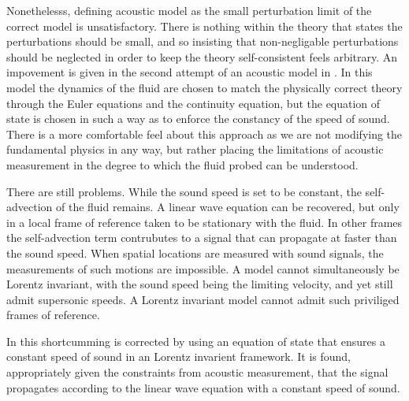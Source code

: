 Nonethelesss, defining acoustic model as the small perturbation limit of the correct model is unsatisfactory.
There is nothing within the theory that states the perturbations should be small,
and so insisting that non-negligable perturbations should be neglected in order to keep the
theory self-consistent feels arbitrary.
An impovement is given in the second attempt of an acoustic model in .
In this model the dynamics of the fluid are chosen to match the physically correct theory through the Euler equations and the continuity
equation,
but the equation of state is chosen in such a way as to enforce the constancy of the speed of sound.
There is a more comfortable feel about this approach as we are not modifying the fundamental physics in any way,
but rather placing the limitations of acoustic measurement in the degree to which the fluid probed can be understood.

There are still problems.
While the sound speed is set to be constant,
the self-advection of the fluid remains.
A linear wave equation can be recovered, but only in a local frame of reference taken to be stationary with the fluid.
In other frames the self-advection term contrubutes to a signal that can propagate at faster than the sound speed.
%
%
When spatial locations are measured with sound signals,
the measurements of such motions are impossible.
A model cannot simultaneously be Lorentz invariant, with the sound speed being the limiting velocity,
and yet still admit supersonic speeds.
A Lorentz invariant model cannot admit such priviliged frames of reference.
%
%

In  this shortcumming is corrected by using an equation of state that ensures a constant speed of sound in an Lorentz invarient framework.
It is found, appropriately given the constraints from acoustic measurement,
that the signal propagates according to the linear wave equation with a constant speed of sound.

